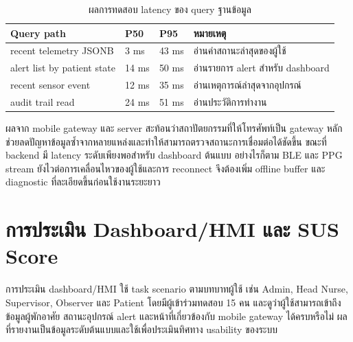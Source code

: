\begin{table}[!htbp]
    \centering
    \caption{ผลการทดสอบ latency ของ query ฐานข้อมูล}
    \label{tab:ch4_db_latency}
    \renewcommand{\arraystretch}{1.16}
    \small
    \setlength{\tabcolsep}{3pt}
    \begin{tabular}{|L{0.30\textwidth}|L{0.17\textwidth}|L{0.17\textwidth}|L{0.25\textwidth}|}
        \hline
        \textbf{Query path} & \textbf{P50} & \textbf{P95} & \textbf{หมายเหตุ} \\ \hline
        recent telemetry JSONB & 3 ms & 43 ms & อ่านค่าสถานะล่าสุดของผู้ใช้ \\ \hline
        alert list by patient state & 14 ms & 50 ms & อ่านรายการ alert สำหรับ dashboard \\ \hline
        recent sensor event & 12 ms & 35 ms & อ่านเหตุการณ์ล่าสุดจากอุปกรณ์ \\ \hline
        audit trail read & 24 ms & 51 ms & อ่านประวัติการทำงาน \\ \hline
    \end{tabular}
\end{table}

ผลจาก mobile gateway และ server สะท้อนว่าสถาปัตยกรรมที่ให้โทรศัพท์เป็น gateway หลักช่วยลดปัญหาข้อมูลซ้ำจากหลายแหล่งและทำให้สามารถตรวจสถานะการเชื่อมต่อได้ชัดขึ้น ขณะที่ backend มี latency ระดับเพียงพอสำหรับ dashboard ต้นแบบ อย่างไรก็ตาม BLE และ PPG stream ยังไวต่อการเคลื่อนไหวของผู้ใช้และการ reconnect จึงต้องเพิ่ม offline buffer และ diagnostic ที่ละเอียดขึ้นก่อนใช้งานระยะยาว
\FloatBarrier

\section{การประเมิน Dashboard/HMI และ SUS Score}
\label{sec:ch4_dashboard_hmi}
การประเมิน dashboard/HMI ใช้ task scenario ตามบทบาทผู้ใช้ เช่น Admin, Head Nurse, Supervisor, Observer และ Patient โดยมีผู้เข้าร่วมทดสอบ 15 คน และดูว่าผู้ใช้สามารถเข้าถึงข้อมูลผู้พักอาศัย สถานะอุปกรณ์ alert และหน้าที่เกี่ยวข้องกับ mobile gateway ได้ครบหรือไม่ ผลที่รายงานเป็นข้อมูลระดับต้นแบบและใช้เพื่อประเมินทิศทาง usability ของระบบ

